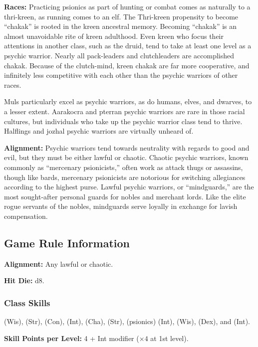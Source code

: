 \textbf{Races:} Practicing psionics as part of hunting or combat comes as naturally to a thri-kreen, as running comes to an elf. The Thri-kreen propensity to become ``chakak'' is rooted in the kreen ancestral memory. Becoming ``chakak'' is an almost unavoidable rite of kreen adulthood. Even kreen who focus their attentions in another class, such as the druid, tend to take at least one level as a psychic warrior. Nearly all pack-leaders and clutchleaders are accomplished chakak. Because of the clutch-mind, kreen chakak are far more cooperative, and infinitely less competitive with each other than the psychic warriors of other races.

Muls particularly excel as psychic warriors, as do humans, elves, and dwarves, to a lesser extent. Aarakocra and pterran psychic warriors are rare in those racial cultures, but individuals who take up the psychic warrior class tend to thrive. Halflings and jozhal psychic warriors are virtually unheard of.

\textbf{Alignment:} Psychic warriors tend towards neutrality with regards to good and evil, but they must be either lawful or chaotic. Chaotic psychic warriors, known commonly as ``mercenary psionicists,'' often work as attack thugs or assassins, though like bards, mercenary psionicists are notorious for switching allegiances according to the highest purse. Lawful psychic warriors, or ``mindguards,'' are the most sought-after personal guards for nobles and merchant lords. Like the elite rogue servants of the nobles, mindguards serve loyally in exchange for lavish compensation.

\subsection{Game Rule Information}

\textbf{Alignment:} Any lawful or chaotic.

\textbf{Hit Die:} d8.

\subsubsection{Class Skills}
 (Wis),  (Str),  (Con),  (Int),  (Cha),  (Str),  (psionics) (Int),  (Wis),  (Dex), and  (Int).

\textbf{Skill Points per Level:} 4 + Int modifier ($\times 4$ at 1st level).

